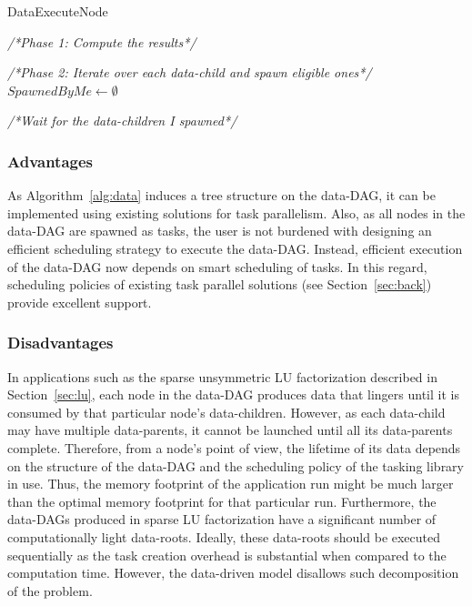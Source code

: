 \documentclass[10pt,conference]{IEEEtran}
\begin{document}
\begin{algorithm}[t]


\caption{DataExecuteNode}
\label{alg:data}


\emph{/*Phase 1: Compute the results*/}\;
 \;

\emph{/*Phase 2: Iterate over each data-child and spawn eligible ones*/}\;
$SpawnedByMe \leftarrow \emptyset$\;

\emph{/*Wait for the data-children I spawned*/}\;
\end{algorithm}

\subsubsection{Advantages}
As Algorithm~\ref{alg:data} induces a tree structure on the data-DAG, it can be
implemented using existing solutions for task parallelism.  Also, as all nodes
in the data-DAG are spawned as tasks, the user is not burdened with designing
an efficient scheduling strategy to execute the data-DAG. Instead, efficient
execution of the data-DAG now depends on smart scheduling of tasks. In this
regard, scheduling policies of existing task parallel solutions (see
Section~\ref{sec:back}) provide excellent support.

\subsubsection{Disadvantages}
In applications such as the sparse unsymmetric LU factorization described in
Section~\ref{sec:lu}, each node in the data-DAG produces data that lingers
until it is consumed by that particular node's data-children.  However, as each
data-child may have multiple data-parents, it cannot be launched until all its
data-parents complete.  Therefore, from a node's point of view, the lifetime of
its data depends on the structure of the data-DAG and the scheduling policy of
the tasking library in use.  Thus, the memory footprint of the application run
might be much larger than the optimal memory footprint for that particular run.
%
Furthermore, the data-DAGs produced in sparse LU factorization have a
significant number of computationally light data-roots.  Ideally, these
data-roots  should be executed sequentially as the task creation overhead is
substantial when compared to the computation time.  However, the data-driven
model disallows such decomposition of the problem.
\end{document}
